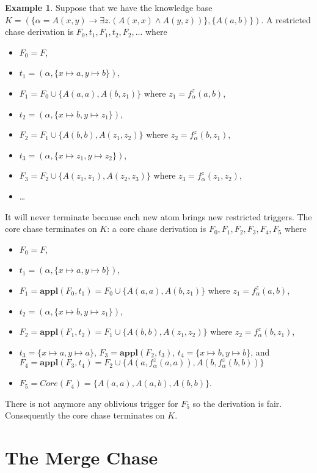 \documentclass{article}
\theoremstyle{definition}
\newtheorem{example}{Example}[section]
\theoremstyle{remark}
\newcommand{\Appl}{\textbf{appl}}
\begin{document}
\begin{example}
Suppose that we have the knowledge base $K=(\{\alpha = A(x,y) \rightarrow \exists z.(A(x,x) \wedge A(y,z))\},\{A(a,b)\})$. A restricted chase derivation is $F_0,t_1,F_1,t_2,F_2,...$ where 
\begin{itemize}
\item $F_0 = F$,
\item $t_1=(\alpha,\{x \mapsto a, y \mapsto b\})$, 
\item $F_1= F_0 \cup \{A(a,a),A(b,z_1)\}$ where $z_1 = f_\alpha^z(a,b)$,
\item $t_2 = (\alpha,\{x \mapsto b, y \mapsto z_1\})$, 
\item $F_2 = F_1 \cup \{A(b,b),A(z_1,z_2)\}$ where $z_2 = f_\alpha^z(b,z_1)$, 
\item $t_3 = (\alpha,\{x \mapsto z_1, y \mapsto z_2\})$, 
\item $F_3 =  F_2 \cup \{A(z_1,z_1),A(z_2,z_3)\}$ where $z_3 = f_\alpha^z(z_1,z_2)$,
\item \ldots\
\end{itemize}
It will never terminate because each new atom brings new restricted triggers. The core chase terminates on $K$: a core chase derivation is $F_0,F_1,F_2,F_3,F_4,F_5$ where 
\begin{itemize}
\item $F_0=F$, 
\item $t_1=(\alpha,\{x \mapsto a, y \mapsto b\})$, 
\item $F_1=\Appl(F_0,t_1) =F_0 \cup \{A(a,a),A(b,z_1)\}$ where $z_1 = f_\alpha^z(a,b)$, 
\item $t_2 = (\alpha,\{x \mapsto b, y \mapsto z_1\})$,
\item $F_2 =\Appl(F_1,t_2) =F_1 \cup \{A(b,b),A(z_1,z_2)\}$ where $z_2 = f_\alpha^z(b,z_1)$,
\item $t_3 = \{x \mapsto a, y \mapsto a\}$, $F_3=\Appl(F_2,t_3)$, $t_4 = \{x \mapsto b, y \mapsto b\}$, and $F_4=\Appl(F_3,t_4) = F_2 \cup \{A(a,f_\alpha^z(a,a)),A(b,f_\alpha^z(b,b))\}$
\item $F_5 = \textit{Core}(F_4)= \{A(a,a),A(a,b),A(b,b)\}$.
\end{itemize} 
There is not anymore any oblivious trigger for $F_5$ so the derivation is fair. Consequently the core chase terminates on $K$.

\end{example}



\section{The Merge Chase}
\end{document}
